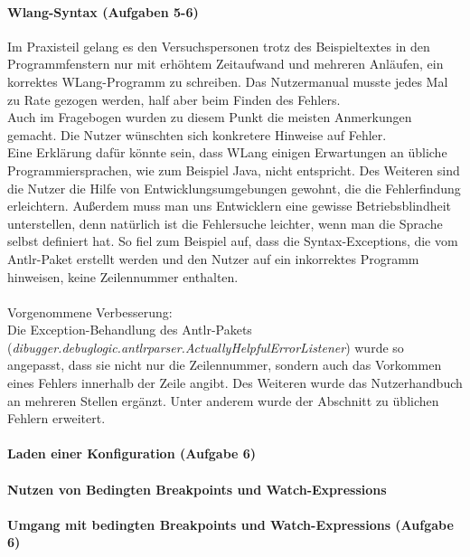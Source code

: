 \documentclass[parskip=full]{scrartcl}
\begin{document}
\paragraph{Wlang-Syntax (Aufgaben 5-6)}
Im Praxisteil gelang es den Versuchspersonen trotz des Beispieltextes in den Programmfenstern nur mit erhöhtem Zeitaufwand und mehreren Anläufen, ein korrektes WLang-Programm zu schreiben. Das Nutzermanual musste jedes Mal zu Rate gezogen werden, half aber beim Finden des Fehlers.\\
Auch im Fragebogen wurden zu diesem Punkt die meisten Anmerkungen gemacht. Die Nutzer wünschten sich konkretere Hinweise auf Fehler. \\
Eine Erklärung dafür könnte sein, dass WLang einigen Erwartungen an übliche Programmiersprachen, wie zum Beispiel Java, nicht entspricht. Des Weiteren sind die Nutzer die Hilfe von Entwicklungsumgebungen gewohnt, die die Fehlerfindung erleichtern. Außerdem muss man uns Entwicklern eine gewisse Betriebsblindheit unterstellen, denn natürlich ist die Fehlersuche leichter, wenn man die Sprache selbst definiert hat. So fiel zum Beispiel auf, dass die Syntax-Exceptions, die vom Antlr-Paket erstellt werden und den Nutzer auf ein inkorrektes Programm hinweisen, keine Zeilennummer enthalten.\\\\
Vorgenommene Verbesserung:\\
Die Exception-Behandlung des Antlr-Pakets (\textit{dibugger.debuglogic.antlrparser.ActuallyHelpfulErrorListener}) wurde so angepasst, dass sie nicht nur die Zeilennummer, sondern auch das Vorkommen eines Fehlers innerhalb der Zeile angibt. Des Weiteren wurde das Nutzerhandbuch an mehreren Stellen ergänzt. Unter anderem wurde der Abschnitt zu üblichen Fehlern erweitert.


\paragraph{Laden einer Konfiguration (Aufgabe 6)}


\paragraph{Nutzen von Bedingten Breakpoints und Watch-Expressions}

\paragraph{Umgang mit bedingten Breakpoints und Watch-Expressions (Aufgabe 6)}
\end{document}

